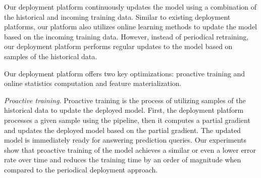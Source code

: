 

Our deployment platform continuously updates the model using a combination of the historical and incoming training data.
Similar to existing deployment platforms, our platform also utilizes online learning methods to update the model based on the incoming training data.
However, instead of periodical retraining, our deployment platform performs regular updates to the model based on samples of the historical data.

Our deployment platform offers two key optimizations: proactive training and online statistics computation and feature materialization. 

\textit{Proactive training.}
Proactive training is the process of utilizing samples of the historical data to update the deployed model.
First, the deployment platform processes a given sample using the pipeline, then it computes a partial gradient and updates the deployed model based on the partial gradient.
The updated model is immediately ready for answering prediction queries.
Our experiments show that proactive training of the model achieves a similar or even a lower error rate over time and reduces the training time by an order of magnitude when compared to the periodical deployment approach.

